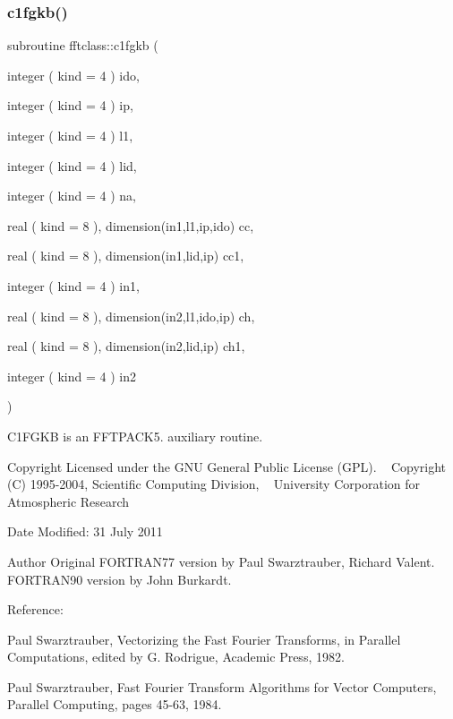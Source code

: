 \subsubsection{\texorpdfstring{c1fgkb()}{c1fgkb()}}
{\footnotesize\ttfamily subroutine fftclass\+::c1fgkb (\begin{DoxyParamCaption}\item[{integer ( kind = 4 )}]{ido,  }\item[{integer ( kind = 4 )}]{ip,  }\item[{integer ( kind = 4 )}]{l1,  }\item[{integer ( kind = 4 )}]{lid,  }\item[{integer ( kind = 4 )}]{na,  }\item[{real ( kind = 8 ), dimension(in1,l1,ip,ido)}]{cc,  }\item[{real ( kind = 8 ), dimension(in1,lid,ip)}]{cc1,  }\item[{integer ( kind = 4 )}]{in1,  }\item[{real ( kind = 8 ), dimension(in2,l1,ido,ip)}]{ch,  }\item[{real ( kind = 8 ), dimension(in2,lid,ip)}]{ch1,  }\item[{integer ( kind = 4 )}]{in2 }\end{DoxyParamCaption})}



C1\+F\+G\+KB is an F\+F\+T\+P\+A\+C\+K5. auxiliary routine. 

\begin{DoxyCopyright}{Copyright}
Licensed under the G\+NU General Public License (G\+PL). ~\newline
 Copyright (C) 1995-\/2004, Scientific Computing Division, ~\newline
 University Corporation for Atmospheric Research 
\end{DoxyCopyright}
\begin{DoxyDate}{Date}
Modified\+: 31 July 2011 
\end{DoxyDate}
\begin{DoxyAuthor}{Author}
Original F\+O\+R\+T\+R\+A\+N77 version by Paul Swarztrauber, Richard Valent. ~\newline
 F\+O\+R\+T\+R\+A\+N90 version by John Burkardt.
\end{DoxyAuthor}
\begin{DoxyVerb}  Reference:

    Paul Swarztrauber,
    Vectorizing the Fast Fourier Transforms,
    in Parallel Computations,
    edited by G. Rodrigue,
    Academic Press, 1982.

    Paul Swarztrauber,
    Fast Fourier Transform Algorithms for Vector Computers,
    Parallel Computing, pages 45-63, 1984.\end{DoxyVerb}
 

